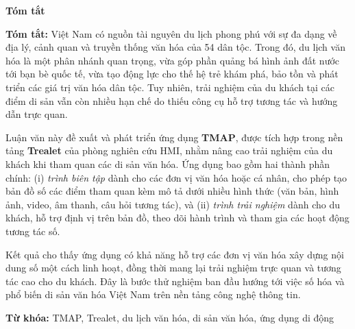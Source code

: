 \begin{center}
\textbf{\large{Tóm tắt}	}
\end{center}

\textbf{Tóm tắt:} Việt Nam có nguồn tài nguyên du lịch phong phú với sự đa dạng về địa lý, cảnh quan và truyền thống văn hóa của 54 dân tộc. Trong đó, du lịch văn hóa là một phân nhánh quan trọng, vừa góp phần quảng bá hình ảnh đất nước tới bạn bè quốc tế, vừa tạo động lực cho thế hệ trẻ khám phá, bảo tồn và phát triển các giá trị văn hóa dân tộc. Tuy nhiên, trải nghiệm của du khách tại các điểm di sản vẫn còn nhiều hạn chế do thiếu công cụ hỗ trợ tương tác và hướng dẫn trực quan.

Luận văn này đề xuất và phát triển ứng dụng \textbf{TMAP}, được tích hợp trong nền tảng \textbf{Trealet} của phòng nghiên cứu HMI, nhằm nâng cao trải nghiệm của du khách khi tham quan các di sản văn hóa. Ứng dụng bao gồm hai thành phần chính: (i) \textit{trình biên tập} dành cho các đơn vị văn hóa hoặc cá nhân, cho phép tạo bản đồ số các điểm tham quan kèm mô tả dưới nhiều hình thức (văn bản, hình ảnh, video, âm thanh, câu hỏi tương tác), và (ii) \textit{trình trải nghiệm} dành cho du khách, hỗ trợ định vị trên bản đồ, theo dõi hành trình và tham gia các hoạt động tương tác số.

Kết quả cho thấy ứng dụng có khả năng hỗ trợ các đơn vị văn hóa xây dựng nội dung số một cách linh hoạt, đồng thời mang lại trải nghiệm trực quan và tương tác cao cho du khách. Đây là bước thử nghiệm ban đầu hướng tới việc số hóa và phổ biến di sản văn hóa Việt Nam trên nền tảng công nghệ thông tin.

\textbf{Từ khóa:} TMAP, Trealet, du lịch văn hóa, di sản văn hóa, ứng dụng di động
